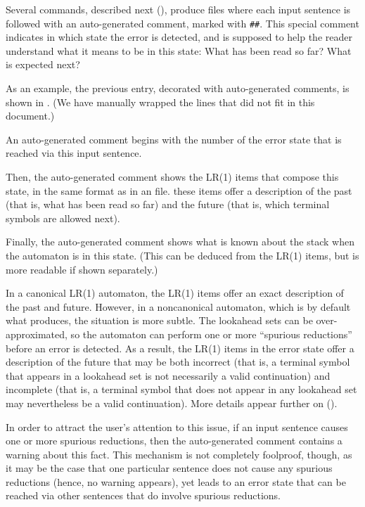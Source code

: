 \documentclass[onecolumn,11pt,nocopyrightspace,preprint]{sigplanconf}
\begin{document}
Several commands, described next (),
produce \messages files where each input sentence is followed with an
auto-generated comment, marked with \verb+##+. This special comment indicates
in which state the error is detected, and is supposed to help the reader
understand what it means to be in this state: What has been read so far? What
is expected next?

As an example, the previous entry, decorated with auto-generated comments, is
shown in . (We have manually wrapped the
lines that did not fit in this document.)

An auto-generated comment begins with the number of the error state that is
reached via this input sentence.

Then, the auto-generated comment shows the LR(1) items that compose this
state, in the same format as in an \automaton file. these items offer a
description of the past (that is, what has been read so far) and the future
(that is, which terminal symbols are allowed next).

Finally, the auto-generated comment shows what is known about the stack when
the automaton is in this state. (This can be deduced from the LR(1) items, but
is more readable if shown separately.)

In a canonical LR(1) automaton, the LR(1) items offer an exact description of
the past and future. However, in a noncanonical automaton, which is by default
what \menhir produces, the situation is more subtle. The lookahead sets can be
over-approximated, so the automaton can perform one or more ``spurious
reductions'' before an error is detected. As a result, the LR(1) items in the
error state offer a description of the future that may be both incorrect (that
is, a terminal symbol that appears in a lookahead set is not necessarily a
valid continuation) and incomplete (that is, a terminal symbol that does not
appear in any lookahead set may nevertheless be a valid continuation). More
details appear further on ().

In order to attract the user's attention to this issue, if an input sentence
causes one or more spurious reductions, then the auto-generated comment
contains a warning about this fact. This mechanism is not completely
foolproof, though, as it may be the case that one particular sentence does not
cause any spurious reductions (hence, no warning appears), yet leads to an
error state that can be reached via other sentences that do involve spurious
reductions.
\end{document}
